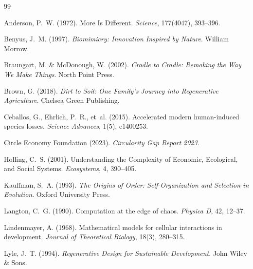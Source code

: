 \documentclass[11pt,a4paper]{article}
\begin{document}


\begin{thebibliography}{99}

Anderson, P.~W. (1972).
\newblock More Is Different.
\newblock \emph{Science}, 177(4047), 393--396.

Benyus, J.~M. (1997).
\newblock \emph{Biomimicry: Innovation Inspired by Nature}.
\newblock William Morrow.

Braungart, M. \& McDonough, W. (2002).
\newblock \emph{Cradle to Cradle: Remaking the Way We Make Things}.
\newblock North Point Press.

Brown, G. (2018).
\newblock \emph{Dirt to Soil: One Family's Journey into Regenerative Agriculture}.
\newblock Chelsea Green Publishing.

Ceballos, G., Ehrlich, P.~R., et~al. (2015).
\newblock Accelerated modern human-induced species losses.
\newblock \emph{Science Advances}, 1(5), e1400253.

{Circle Economy Foundation} (2023).
\newblock \emph{Circularity Gap Report 2023}.

Holling, C.~S. (2001).
\newblock Understanding the Complexity of Economic, Ecological, and Social Systems.
\newblock \emph{Ecosystems}, 4, 390--405.

Kauffman, S.~A. (1993).
\newblock \emph{The Origins of Order: Self-Organization and Selection in Evolution}.
\newblock Oxford University Press.

Langton, C.~G. (1990).
\newblock Computation at the edge of chaos.
\newblock \emph{Physica D}, 42, 12--37.

Lindenmayer, A. (1968).
\newblock Mathematical models for cellular interactions in development.
\newblock \emph{Journal of Theoretical Biology}, 18(3), 280--315.

Lyle, J.~T. (1994).
\newblock \emph{Regenerative Design for Sustainable Development}.
\newblock John Wiley \& Sons.


\end{thebibliography}
\end{document}
